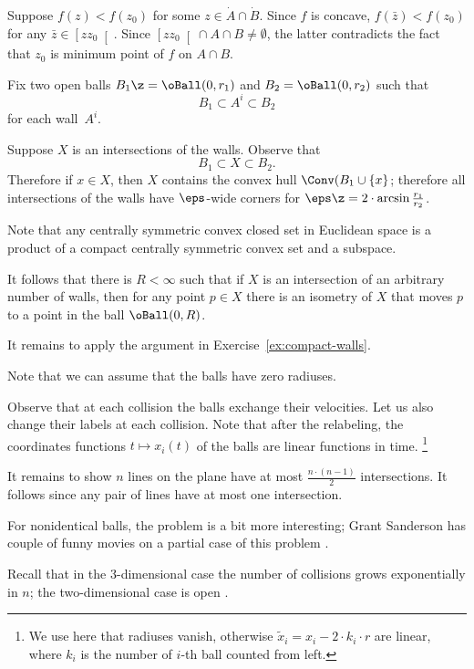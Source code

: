 Suppose $f(z)<f(z_0)$ for some $z\in \dot A\cap\dot B$.
Since $f$ is concave,
$f(\bar z)<f(z_0)$ for any $\bar z \in \left[zz_0\right[$.
Since $\left[zz_0\right[\cap A\cap B\ne\emptyset$,
the latter contradicts the fact that $z_0$ is minimum point of $f$ on $A\cap B$.


Fix two open balls $B_1\z=\oBall(0,r_1)$ and $B_2=\oBall(0,r_2)$
such that 
\[B_1\subset A^i\subset B_2\]
for each wall~$A^i$.

Suppose $X$ is an intersections of  the walls.
Observe that 
\[B_1\subset X\subset B_2.\]
Therefore if $x\in X$, then $X$ contains the convex hull $\Conv(B_1\cup\{x\}$;
therefore all intersections of the walls have $\eps$-wide corners for $\eps\z=2\cdot \arcsin\tfrac{r_1}{r_2}$.

Note that any centrally symmetric convex closed set in Euclidean space is a product of a compact centrally symmetric convex set and a subspace.

It follows that there is $R<\infty$
such that if $X$ is an intersection of an arbitrary number of walls, then for any point $p\in X$ there is an isometry of $X$ 
that moves  $p$ to a point in the ball $\oBall(0,R)$.

It remains to apply the argument in Exercise~\ref{ex:compact-walls}.

Note that we can assume that the balls have zero radiuses.

Observe that at each collision the balls exchange their velocities.
Let us also change their labels at each collision.
Note that after the relabeling,  the coordinates functions $t\mapsto x_{i}(t)$ of the balls are linear functions in time.%
\footnote{We use here that radiuses vanish, otherwise $\tilde x_i=x_i-2\cdot k_i\cdot r$ are linear, where $k_i$ is the number of $i$-th ball counted from left.} 

It remains to show $n$ lines on the plane have at most $\tfrac{n\cdot(n-1)}2$ intersections.
It follows since any pair of lines have at most one intersection.

For nonidentical balls, the problem is a bit more interesting;
Grant Sanderson has couple of funny movies on a partial case of this problem \cite{sanderson}.

Recall that in the 3-dimensional case the number of collisions grows exponentially in $n$; the two-dimensional case is open \cite{burago-ivanov}.

